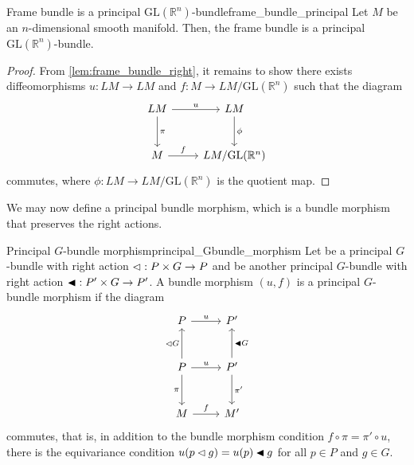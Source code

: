 \begin{theorem}{Frame bundle is a principal \(\mathrm{GL}(\mathbb{R}^n)\)-bundle}{frame_bundle_principal}
    Let \(M\) be an \(n\)-dimensional smooth manifold. Then, the frame bundle  is a principal \(\mathrm{GL}(\mathbb{R}^n)\)-bundle.
\end{theorem}
\begin{proof}
    From \cref{lem:frame_bundle_right}, it remains to show there exists diffeomorphisms \(u : LM \to LM\) and \(f : M \to LM/\mathrm{GL}(\mathbb{R}^n)\) such that the diagram
    \begin{equation*}
        \begin{tikzcd}[column sep = normal, row sep = large]
            LM \arrow{r}{u} \arrow{d}{\pi} & LM \arrow{d}{\phi}\\
            M \arrow{r}{f} & LM/\mathrm{GL}(\mathbb{R}^n)
        \end{tikzcd}
    \end{equation*}
    commutes, where \(\phi : LM \to LM/\mathrm{GL}(\mathbb{R}^n)\) is the quotient map. \todo
\end{proof}

We may now define a principal bundle morphism, which is a bundle morphism that preserves the right actions.
\begin{definition}{Principal \(G\)-bundle morphism}{principal_Gbundle_morphism}
    Let  be a principal \(G\)-bundle with right action \(\mathbin{\vartriangleleft} : P \times G \to P\) and  be another principal \(G\)-bundle with right action \(\mathbin{\blacktriangleleft} : P' \times G \to P'\). A bundle morphism \((u,f)\) is a principal \(G\)-bundle morphism if the diagram
    \begin{equation*}
        \begin{tikzcd}[column sep = normal, row sep = large]
            P \arrow{r}{u} & P'\\
            P \arrow[swap]{d}{\pi} \arrow{u}{\ract G} \arrow{r}{u} & P' \arrow[swap]{u}{\ractalt G} \arrow{d}{\pi'}\\
            M \arrow{r}{f} & M'
        \end{tikzcd}
    \end{equation*}
    commutes, that is, in addition to the bundle morphism condition \(f \circ \pi = \pi' \circ u\), there is the equivariance condition \(u(p \mathbin{\vartriangleleft} g) = u(p) \mathbin{\blacktriangleleft} g\) for all \(p \in P\) and \(g \in G\).
\end{definition}

